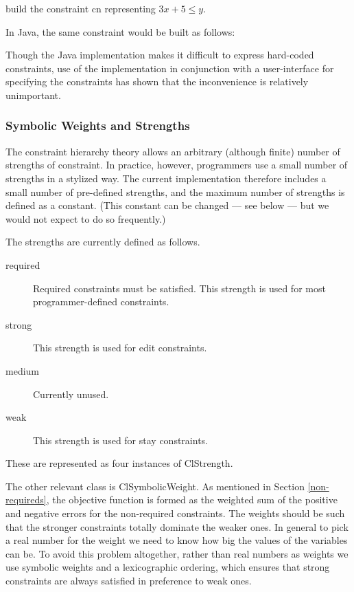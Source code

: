 \documentclass{article}
\begin{document}
\hspace*{1 cm}{\sf ClLinearInequality cn(3*x+5, cnLEQ,y); ~ ~ ~ // C++}

build the constraint {\sf cn} representing $3 x + 5 \leq y$.

In Java, the same constraint would be built as follows:

\hspace*{1 cm}{\sf ClLinearInequality cn = new
  ClLinearInequality(CL.Plus(CL.Times(x,3),5), CL.LEQ, y);}

Though the Java implementation makes it difficult to express hard-coded
constraints, use of the implementation in conjunction with a
user-interface for specifying the constraints has shown that the
inconvenience is relatively unimportant.

\subsubsection{Symbolic Weights and Strengths}
\label{symweights}

The constraint hierarchy theory allows an arbitrary (although finite)
number of strengths of constraint.  In practice, however, programmers use a
small number of strengths in a stylized way.  The current implementation
therefore includes a small number of pre-defined strengths, and the maximum
number of strengths is defined as a constant.  (This constant can be
changed --- see below --- but we would not expect to do so frequently.)

The strengths are currently defined as follows.

\begin{description}

\item[{\sf required}]  Required constraints must be satisfied.  This
strength is used for most programmer-defined constraints.

\item[{\sf strong}] This strength is used for edit constraints.

\item[{\sf medium}] Currently unused.  

\item[{\sf weak}] This strength is used for stay constraints.

\end{description}

These are represented as four instances of {\sf ClStrength}.

The other relevant class is {\sf ClSymbolicWeight}.  As mentioned in
Section \ref{non-requireds}, the objective function is formed as the
weighted sum of the positive and negative errors for the non-required
constraints.  The weights should be such that the stronger constraints
totally dominate the weaker ones.  In general to pick a real number for the
weight we need to know how big the values of the variables can be.  To
avoid this problem altogether, rather than real numbers as weights we use
symbolic weights and a lexicographic ordering, which ensures that strong
constraints are always satisfied in preference to weak ones.  
\end{document}
